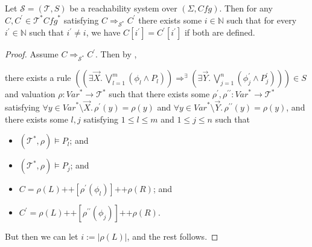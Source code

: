 \documentclass{article}
\newenvironment{proofenv}
  {
    \VerbatimEnvironment\begin{tcolorbox}[colback=black!0!white] %
  }
  {
   \end{tcolorbox}
  }
\begin{document}
\begin{lemma}\label{lem:atMostOneComponentChanges}
    Let $\mathcal{S} = (\mathcal{T}, S)$ be a reachability system over $(\Sigma, \mathit{Cfg})$.
    Then for any $C,C^\prime \in \mathcal{T}^*{\mathit{Cfg}^*}$ satisfying $C \Rightarrow_{\mathcal{S}^*} C^\prime$
    there exists some $i \in \mathbb{N}$ such that
    for every $i^\prime \in \mathbb{N}$ such that $i^\prime \not = i$,
    we have $C[i^\prime] = C^\prime[i^\prime]$ if both are defined.
\end{lemma}
\begin{proof}
Assume $C \Rightarrow_{\mathcal{S}^*} C^\prime$.
Then by ,
\begin{proofenv}
    there exists a rule $((\exists \vec{X}.\, \bigvee_{l=1}^{m} (\phi_l \land P_l)) \Rightarrow^\exists (\exists \vec{Y}.\,     \bigvee_{j=1}^{n} (\phi^\prime_j \land P^\prime_j))) \in S$
    and valuation $\rho : \mathit{Var}^* \to \mathcal{T}^*$ such that
    there exists some $\rho^\prime,\rho^{\prime\prime} : \mathit{Var}^* \to \mathcal{T}^*$
    satisfying $\forall y \in \mathit{Var}^* \setminus \vec{X}.\, \rho^\prime(y) = \rho(y)$
    and $\forall y \in \mathit{Var}^* \setminus \vec{Y}.\, \rho^{\prime\prime}(y) = \rho(y)$,
    and there exists some $l,j$ satisfying $1 \leq l \leq m$ and $1 \leq j \leq n$ such that
    \begin{itemize}
        \item $(\mathcal{T}^*, \rho) \vDash P_l$; and
        \item $(\mathcal{T}^*, \rho) \vDash P_j$; and
        \item $C = \rho(L) \texttt{++} [\rho^\prime(\phi_l)] \texttt{++} \rho(R)$; and
        \item $C^\prime = \rho(L) \texttt{++} [\rho^{\prime\prime}(\phi_j)] 
        \texttt{++} \rho(R)$.
    \end{itemize}
\end{proofenv}
But then we can let $i := |\rho(L)|$, and the rest follows.
\end{proof}
\end{document}
